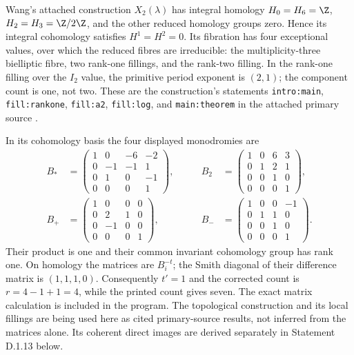 \begin{example}
\label{st:D.1.6}
Wang's attached construction $X_2(\lambda)$ has integral homology
$H_0=H_6=\Z$, $H_2=H_3=\Z/2\Z$, and the other reduced
homology groups zero. Hence its integral cohomology satisfies
$H^1=H^2=0$. Its fibration has four exceptional values, over which
the reduced fibres are irreducible: the multiplicity-three
bielliptic fibre, two rank-one fillings, and the rank-two filling.
In the rank-one filling over the $I_2$ value, the primitive period
exponent is $(2,1)$; the component count is one, not two.
These are the construction's statements
\texttt{intro:main}, \texttt{fill:rankone},
\texttt{fill:a2}, \texttt{fill:log}, and
\texttt{main:theorem} in the attached primary source
\cite{Wang2026}.

In its cohomology basis the four displayed monodromies are
\[
\begin{aligned}
B_*&=\begin{pmatrix}1&0&-6&-2\\0&-1&-1&1\\0&1&0&-1\\0&0&0&1\end{pmatrix},&\qquad
B_2&=\begin{pmatrix}1&0&6&3\\0&1&2&1\\0&0&1&0\\0&0&0&1\end{pmatrix},\\
B_+&=\begin{pmatrix}1&0&0&0\\0&2&1&0\\0&-1&0&0\\0&0&0&1\end{pmatrix},&\qquad
B_-&=\begin{pmatrix}1&0&0&-1\\0&1&1&0\\0&0&1&0\\0&0&0&1\end{pmatrix}.
\end{aligned}
\]
Their product is one and their common invariant cohomology group
has rank one. On homology the matrices are $B_i^{-t}$; the Smith
diagonal of their difference matrix is $(1,1,1,0)$. Consequently
$t'=1$ and the corrected count is $r=4-1+1=4$, while the printed
count gives seven. The exact matrix calculation is included in the
program. The topological construction and its local fillings are
being used here as cited primary-source results, not inferred from
the matrices alone. Its coherent direct images are derived separately
in Statement D.1.13 below.
\end{example}

